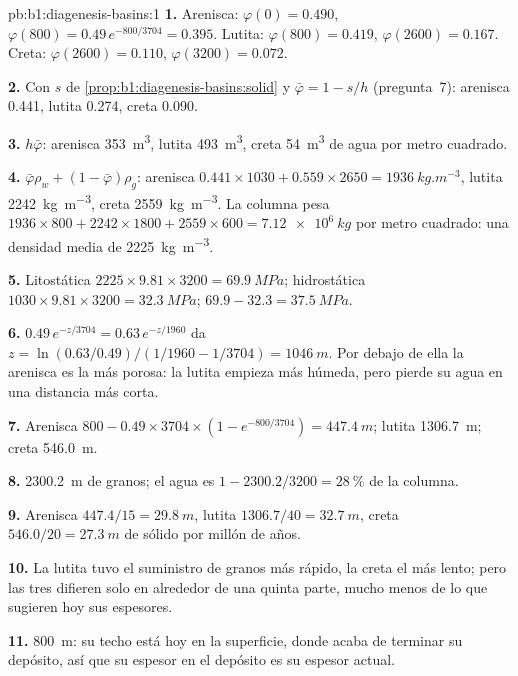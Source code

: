 \begin{solution}{pb:b1:diagenesis-basins:1}
\textbf{1.} Arenisca: $\varphi(0) = \num{0.490}$, $\varphi(800) =
0.49\,e^{-800/3704} = \num{0.395}$. Lutita: $\varphi(800) = \num{0.419}$,
$\varphi(2600) = \num{0.167}$. Creta: $\varphi(2600) = \num{0.110}$,
$\varphi(3200) = \num{0.072}$.

\textbf{2.} Con $s$ de \cref{prop:b1:diagenesis-basins:solid} y $\bar\varphi
= 1 - s/h$ (pregunta~7): arenisca \num{0.441}, lutita \num{0.274}, creta
\num{0.090}.

\textbf{3.} $h\bar\varphi$: arenisca \qty{353}{m^3}, lutita \qty{493}{m^3}, creta
\qty{54}{m^3} de agua por metro cuadrado.

\textbf{4.} $\bar\varphi\rho_w + (1 - \bar\varphi)\rho_g$: arenisca
$0.441\times1030 + 0.559\times2650 = \qty{1936}{kg.m^{-3}}$, lutita
\qty{2242}{kg.m^{-3}}, creta \qty{2559}{kg.m^{-3}}. La columna pesa
$1936\times800 + 2242\times1800 + 2559\times600 = \qty{7.12e6}{kg}$ por metro cuadrado: una densidad media de \qty{2225}{kg.m^{-3}}.

\textbf{5.} Litostática $2225\times9.81\times3200 = \qty{69.9}{MPa}$; hidrostática
$1030\times9.81\times3200 = \qty{32.3}{MPa}$; 
$69.9 - 32.3 = \qty{37.5}{MPa}$.

\textbf{6.} $0.49\,e^{-z/3704} = 0.63\,e^{-z/1960}$ da $z = \ln(0.63/0.49)
/(1/1960 - 1/3704) = \qty{1046}{m}$. Por debajo de ella la arenisca es la más porosa:
la lutita empieza más húmeda, pero pierde su agua en una distancia más corta.

\textbf{7.} Arenisca $800 - 0.49\times3704\times(1 - e^{-800/3704}) =
\qty{447.4}{m}$; lutita \qty{1306.7}{m}; creta \qty{546.0}{m}.

\textbf{8.} \qty{2300.2}{m} de granos; el agua es $1 - 2300.2/3200 =
\qty{28}{\%}$ de la columna.

\textbf{9.} Arenisca $447.4/15 = \qty{29.8}{m}$, lutita $1306.7/40 =
\qty{32.7}{m}$, creta $546.0/20 = \qty{27.3}{m}$ de sólido por millón de años.

\textbf{10.} La lutita tuvo el suministro de granos más rápido, la creta el más lento; pero las tres difieren solo en alrededor de una quinta parte, mucho menos de lo que sugieren hoy sus espesores.

\textbf{11.} \qty{800}{m}: su techo está hoy en la superficie, donde acaba de terminar su depósito, así que su espesor en el depósito es su espesor actual.


\end{solution}
